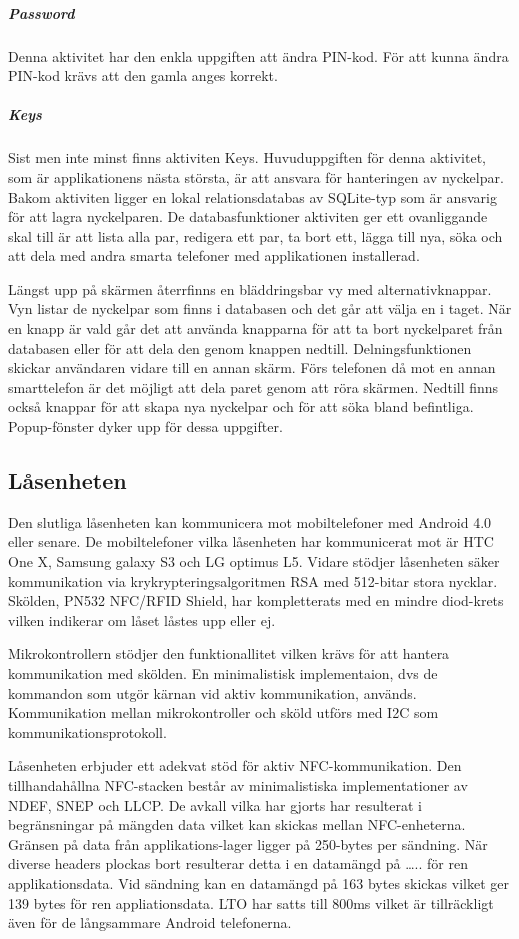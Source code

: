 \documentclass[11pt]{article}
\begin{document}
\subparagraph{Password}
Denna aktivitet har den enkla uppgiften att ändra PIN-kod. För att kunna ändra PIN-kod krävs att den gamla anges korrekt.

\subparagraph{Keys}
Sist men inte minst finns aktiviten Keys. Huvuduppgiften för denna aktivitet, som är applikationens nästa största, är att ansvara för hanteringen av nyckelpar. Bakom aktiviten ligger en lokal relationsdatabas av SQLite-typ som är ansvarig för att lagra nyckelparen. De databasfunktioner aktiviten ger ett ovanliggande skal till är att lista alla par, redigera ett par, ta bort ett, lägga till nya, söka och att dela med andra smarta telefoner med applikationen installerad.

Längst upp på skärmen återrfinns en bläddringsbar vy med alternativknappar. Vyn listar de nyckelpar som finns i databasen och det går att välja en i taget. När en knapp är vald går det att använda knapparna för att ta bort nyckelparet från databasen eller för att dela den genom knappen nedtill. Delningsfunktionen skickar användaren vidare till en annan skärm. Förs telefonen då mot en annan smarttelefon är det möjligt att dela paret genom att röra skärmen. Nedtill finns också knappar för att skapa nya nyckelpar och för att söka bland befintliga. Popup-fönster dyker upp för dessa uppgifter.

\subsection{Låsenheten}
Den slutliga låsenheten kan kommunicera mot mobiltelefoner med Android 4.0 eller senare. De mobiltelefoner vilka låsenheten har kommunicerat mot är HTC One X, Samsung galaxy S3 och LG optimus L5. Vidare stödjer låsenheten säker kommunikation via krykrypteringsalgoritmen RSA med 512-bitar stora nycklar. Skölden, PN532 NFC/RFID Shield, har kompletterats med en mindre diod-krets vilken indikerar om låset låstes upp eller ej.

Mikrokontrollern stödjer den funktionallitet vilken krävs för att hantera kommunikation med skölden. En minimalistisk implementaion, dvs de kommandon som utgör kärnan vid aktiv kommunikation, används. Kommunikation mellan mikrokontroller och sköld utförs med I2C som kommunikationsprotokoll.

Låsenheten  erbjuder ett adekvat stöd för aktiv NFC-kommunikation. Den tillhandahållna NFC-stacken består av 
minimalistiska implementationer av NDEF, SNEP och LLCP. De avkall vilka har gjorts har resulterat i begränsningar på mängden data vilket kan skickas mellan NFC-enheterna. Gränsen på data från applikations-lager ligger på 250-bytes per sändning. När diverse headers plockas bort resulterar detta i en datamängd på ….. för ren applikationsdata. Vid sändning kan en datamängd på 163 bytes skickas vilket ger 139 bytes för ren appliationsdata.  LTO har satts till 800ms vilket är tillräckligt även för de långsammare Android telefonerna.
\end{document}
